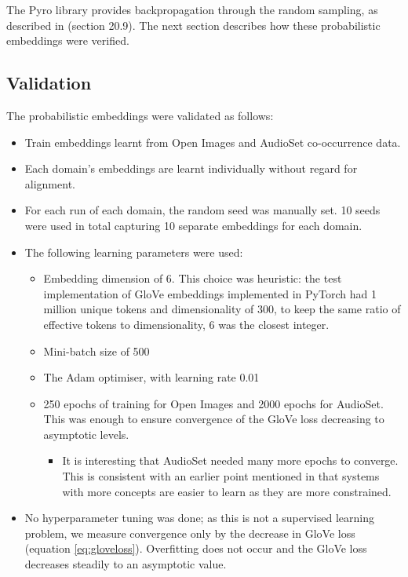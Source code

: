 The Pyro library provides backpropagation through the random sampling, as described in \cite{deeplearninggoodfellow} (section 20.9). The next section describes how these probabilistic embeddings were verified. 

\subsection{Validation}

The probabilistic embeddings were validated as follows:

\begin{itemize}
    \item Train embeddings learnt from Open Images and AudioSet co-occurrence data. 
    \item Each domain's embeddings are learnt individually without regard for alignment. 
    \item For each run of each domain, the random seed was manually set. 10 seeds were used in total capturing 10 separate embeddings for each domain. 
    \item The following learning parameters were used:
    \begin{itemize}
        \item Embedding dimension of 6. This choice was heuristic: the test implementation of GloVe embeddings implemented in PyTorch had 1 million unique tokens and dimensionality of 300, to keep the same ratio of effective tokens to dimensionality, 6 was the closest integer. 
        \item Mini-batch size of 500
        \item The Adam \cite{kingma2017adam} optimiser, with learning rate 0.01
        \item 250 epochs of training for Open Images and 2000 epochs for AudioSet. This was enough to ensure convergence of the GloVe loss decreasing to asymptotic levels. 
        \begin{itemize}
            \item It is interesting that AudioSet needed many more epochs to converge. This is consistent with an earlier point mentioned in \cite{GOLDSTONE2002295} that systems with more concepts are easier to learn as they are more constrained. 
        \end{itemize}
    \end{itemize}
    \item No hyperparameter tuning was done; as this is not a supervised learning problem, we measure convergence only by the decrease in GloVe loss (equation \ref{eq:gloveloss}). Overfitting does not occur and the GloVe loss decreases steadily to an asymptotic value. 
\end{itemize}

